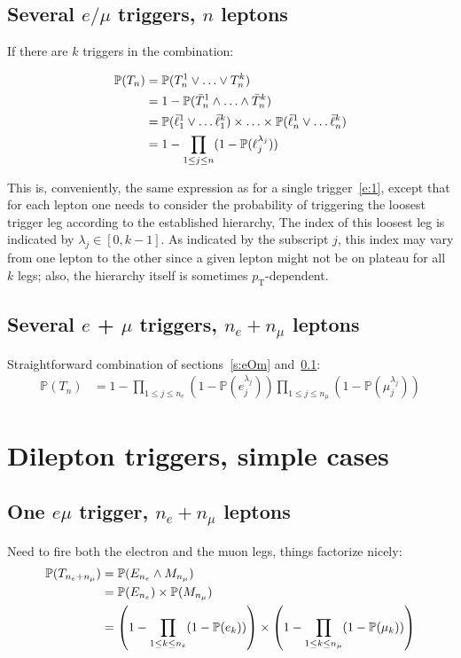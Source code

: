 \documentclass{article}
\newcommand{\pro}{\ensuremath{\mathbb{P}}}
\begin{document}
\subsection{Several $e/\mu$ triggers, $n$ leptons}
\label{s:x1e}

If there are $k$ triggers in the combination: 

\begin{align}
\pro(T_n)&=\pro(T^{1}_n\vee\ldots\vee T^{k}_n) \notag\\
&= 1 - \pro(\bar T^1_n\wedge\ldots\wedge\bar T_n^k) \notag\\
&= \pro(\bar \ell_1^1\vee\ldots\bar\ell_1^k)\times\ldots\times\pro(\bar \ell_n^1\vee\ldots\bar\ell_n^k)\notag\\
& = 1- \prod_{1\leq j\leq n} (1-\pro(\ell_j^{\lambda_j}))
\end{align}

This is, conveniently, the same expression as for a single trigger~\ref{e:1}, except that for each lepton 
one needs to consider the probability of triggering the loosest trigger leg according to the established hierarchy, 
The index of this loosest leg is indicated by $\lambda_j\in [0,k-1]$. 
As indicated by the subscript $j$, this index may vary from one lepton 
to the other since a given lepton might not be on plateau for all $k$ legs; 
also, the hierarchy itself is sometimes $p_\mathrm{T}$-dependent. 

\subsection{Several $e$ + $\mu$ triggers, $n_e+n_\mu$ leptons}
\label{s:x1l}

Straightforward combination of sections~\ref{s:eOm} and~\ref{s:x1e}:
\begin{align}
\pro(T_n)&=
1- \prod_{1\leq j\leq n_e} (1-\pro(e_j^{\lambda_j}))\prod_{1\leq j\leq n_\mu} (1-\pro(\mu_j^{\lambda_j}))
\label{e:x1l}
\end{align}


\section{Dilepton triggers, simple cases}

\subsection{One $e\mu$ trigger, $n_e+n_\mu$ leptons}

Need to fire both the electron and the muon legs, things factorize nicely: 
\begin{align}
\pro(T_{n_e+n_\mu})&=\pro(E_{n_e}\wedge M_{n_\mu}) \notag\\
&= \pro(E_{n_e})\times\pro(M_{n_\mu})\notag\\
&=\left(1- \prod_{1\leq k\leq n_e} (1-\pro(e_k))\right)\times\left(1- \prod_{1\leq k\leq n_\mu} (1-\pro(\mu_k))\right)
\end{align}
\end{document}
